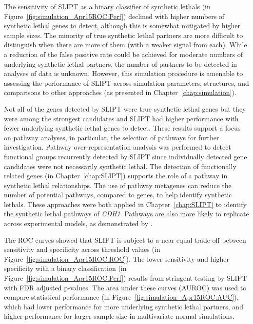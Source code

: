 The sensitivity of \gls{SLIPT} as a binary classifier of \glspl{synthetic lethal} (in Figure~\ref{fig:simulation_Apr15ROC:Perf}) declined with higher numbers of \gls{synthetic lethal} genes to detect, although this is somewhat mitigated by higher sample sizes. The minority of true \gls{synthetic lethal} partners are more difficult to distinguish when there are more of them (with a weaker  signal from each). While a reduction of the false positive rate could be achieved for moderate numbers of underlying \gls{synthetic lethal} partners, the number of partners to be detected in analyses of  data is unknown. However, this simulation procedure is amenable to assessing the performance of \gls{SLIPT} across simulation parameters,  structures, and comparisons to other approaches (as presented in Chapter~\ref{chap:simulation}).

Not all of the genes detected by \gls{SLIPT} were true \gls{synthetic lethal} genes but they were among the strongest candidates and \gls{SLIPT} had higher performance with fewer underlying \gls{synthetic lethal} genes to detect. These results support a focus on pathway analyses, in particular, the selection of pathways for further investigation. Pathway over-representation analysis was performed to detect functional groups recurrently detected by \gls{SLIPT} since individually detected gene candidates were not necessarily \gls{synthetic lethal}. The detection of functionally related genes (in Chapter~\ref{chap:SLIPT}) supports the role of a pathway in \gls{synthetic lethal} relationships. The use of pathway \glspl{metagene} can reduce the number of potential pathways, compared to genes, to help identify \glspl{synthetic lethal}. These approaches were both applied in Chapter~\ref{chap:SLIPT} to identify the \gls{synthetic lethal} pathways of \textit{CDH1}. Pathways are also more likely to replicate across experimental models, as demonstrated by \citet{Dixon2008}.
 
The \gls{ROC} curves showed that \gls{SLIPT} is subject to a near equal trade-off between sensitivity and specificity across threshold values (in Figure~\ref{fig:simulation_Apr15ROC:ROC}). The lower sensitivity and higher specificity with a binary classification (in Figure~\ref{fig:simulation_Apr15ROC:Perf}) results from stringent testing by \gls{SLIPT} with \gls{FDR} adjusted p-values. The area under these curves (\gls{AUROC}) was used to compare statistical performance (in Figure~\ref{fig:simulation_Apr15ROC:AUC}), which had lower performance for more underlying \gls{synthetic lethal} partners, and higher performance for larger sample size in multivariate normal simulations.

